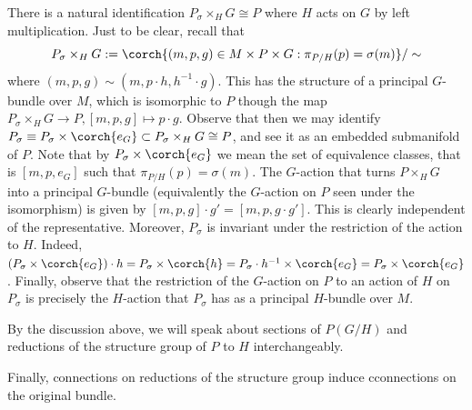 \begin{obs} \label{obs_red_struc_group}
    There is a natural identification \(P_\sigma \times_H G\cong P\) where \(H\) acts on \(G\) by left multiplication. Just to be clear, recall that
    \[
    P_\sigma \times _H G:=\corch{(m,p, g)\in M \times P\times G : \pi_{P/H}(p)=\sigma(m)}/\sim
    \]
    where \((m,p,g)\sim(m, p\cdot h, h^{-1}\cdot g)\). This has the structure of a principal \(G\)-bundle over \(M\), which is isomorphic to \(P\) though the map \(P_\sigma \times_H G \to P, [m,p,g] \mapsto p\cdot g\). Observe that then we may identify \(P_\sigma \equiv P_\sigma \times \corch{e_G} \subset P_\sigma \times_HG \cong P\), and see it as an embedded submanifold of \(P\). Note that by \(P_\sigma \times \corch{e_G}\) we mean the set of equivalence classes, that is \([m,p,e_G]\) such that \(\pi_{P/H}(p)=\sigma(m)\). The \(G\)-action that turns \(P \times_H G\) into a principal \(G\)-bundle (equivalently the \(G\)-action on \(P\) seen under the isomorphism) is given by \([m,p,g]\cdot g'=[m, p, g\cdot g']\). This is clearly independent of the representative. Moreover, \(P_\sigma\) is invariant under the restriction of the action to \(H\). Indeed, \((P_\sigma \times \corch{e_G})\cdot h=P_\sigma\times \corch{h}=P_\sigma\cdot h^{-1}\times \corch{e_G}=P_\sigma\times\corch{e_G}\). Finally, observe that the restriction of the \(G\)-action on \(P\) to an action of \(H\) on \(P_\sigma\) is precisely the \(H\)-action that \(P_\sigma\) has as a principal \(H\)-bundle over \(M\).
\end{obs}
By the discussion above, we will speak about sections of \(P(G/H)\) and reductions of the structure group of \(P\) to \(H\) interchangeably. 

Finally, connections on reductions of the structure group induce cconnections on the original bundle.

